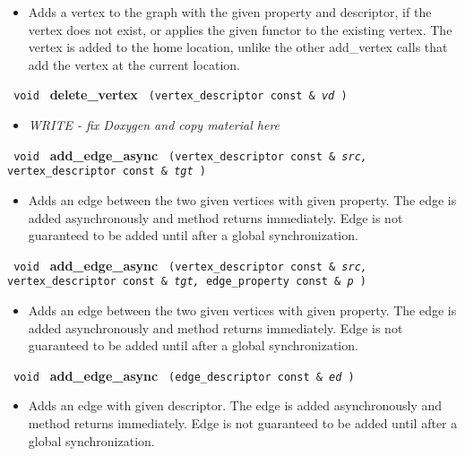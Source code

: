 \begin{itemize}
\item
Adds a vertex to the graph with the given property and descriptor, if the vertex does not exist, or applies the given functor to the existing vertex. The vertex is added to the home location, unlike the other add\_vertex calls that add the vertex at the current location.
\end{itemize}

\noindent
\texttt{%
void
}
\newline
\textbf{delete\_vertex}%
\texttt{%
(vertex\_descriptor const \&
\textit{vd}%
)
}

\begin{itemize}
\item
\textit{WRITE - fix Doxygen and copy material here}
\end{itemize}

\noindent
\texttt{%
void
}
\newline
\textbf{add\_edge\_async}%
\texttt{%
(vertex\_descriptor const \&
\textit{src,}%
vertex\_descriptor const \&
\textit{tgt}%
)
}

\begin{itemize}
\item
Adds an edge between the two given vertices with given property. The edge is added asynchronously and method returns immediately. Edge is not guaranteed to be added until after a global synchronization.
\end{itemize}

\noindent
\texttt{%
void
}
\newline
\textbf{add\_edge\_async}%
\texttt{%
(vertex\_descriptor const \&
\textit{src,}%
vertex\_descriptor
const \&
\textit{tgt,}%
edge\_property const \&
\textit{p}%
)
}

\begin{itemize}
\item
Adds an edge between the two given vertices with given property. The edge is added asynchronously and method returns immediately. Edge is not guaranteed to be added until after a global synchronization.
\end{itemize}

\noindent
\texttt{%
void
}
\newline
\textbf{add\_edge\_async}%
\texttt{%
(edge\_descriptor const \&
\textit{ed}%
)
}

\begin{itemize}
\item
Adds an edge with given descriptor. The edge is added asynchronously and method returns immediately. Edge is not guaranteed to be added until after a global synchronization.
\end{itemize}

